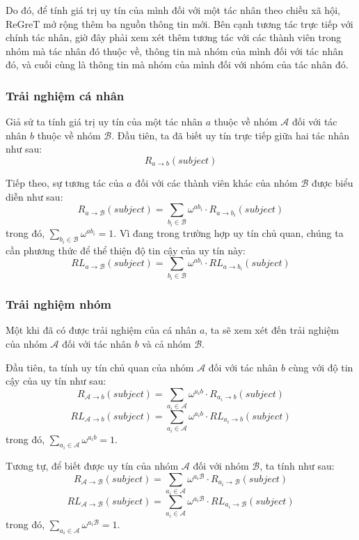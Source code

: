 Do đó, để tính giá trị uy tín của mình đối với một tác nhân theo chiều xã hội, ReGreT mở rộng thêm ba nguồn thông tin mới. Bên cạnh tương tác trực tiếp với chính tác nhân, giờ đây phải xem xét thêm
tương tác với các thành viên trong nhóm mà tác nhân đó thuộc về, thông tin mà nhóm của mình đối với tác nhân đó, và cuối cùng là thông tin mà nhóm của mình đối với nhóm của tác nhân đó.

\subsubsection{Trải nghiệm cá nhân}

Giả sử ta tính giá trị uy tín của một tác nhân $a$ thuộc về nhóm $\mathcal{A}$ đối với tác nhân $b$ thuộc về nhóm $\mathcal{B}$.
Đầu tiên, ta đã biết uy tín trực tiếp giữa hai tác nhân như sau:
\[R_{a \rightarrow b}(subject)\]

Tiếp theo, sự tương tác của $a$ đối với các thành viên khác của nhóm $\mathcal{B}$ được biểu diễn như sau:
\[R_{a \rightarrow \mathcal{B}}(subject)=\sum_{b_i \in \mathcal{B}} \omega^{ab_i} \cdot R_{a \rightarrow b_i}(subject)\]
trong đó, $\displaystyle\sum_{b_i \in \mathcal{B}} \omega^{ab_i} = 1$.
Vì đang trong trường hợp uy tín chủ quan, chúng ta cần phương thức để thể thiện độ tin cậy của uy tín này:
\[RL_{a \rightarrow \mathcal{B}}(subject)=\sum_{b_i \in \mathcal{B}} \omega^{ab_i} \cdot RL_{a \rightarrow b_i}(subject)\]

\subsubsection{Trải nghiệm nhóm}

Một khi đã có được trải nghiệm của cá nhân $a$, ta sẽ xem xét đến trải nghiệm của nhóm $\mathcal{A}$ đối với tác nhân $b$ và cả nhóm $\mathcal{B}$.

Đầu tiên, ta tính uy tín chủ quan của nhóm $\mathcal{A}$ đối với tác nhân $b$ cùng với độ tin cậy của uy tín như sau:
\[R_{\mathcal{A} \rightarrow b}(subject)=\sum_{a_i \in \mathcal{A}} \omega^{a_ib} \cdot R_{a_i \rightarrow b}(subject)\]
\[RL_{\mathcal{A} \rightarrow b}(subject)=\sum_{a_i \in \mathcal{A}} \omega^{a_ib} \cdot RL_{a_i \rightarrow b}(subject)\]
trong đó, $\displaystyle\sum_{a_i \in \mathcal{A}} \omega^{a_ib} = 1$.

Tương tự, để biết được uy tín của nhóm $\mathcal{A}$ đối với nhóm $\mathcal{B}$, ta tính như sau:
\[R_{\mathcal{A} \rightarrow \mathcal{B}}(subject)=\sum_{a_i \in \mathcal{A}} \omega^{a_i\mathcal{B}} \cdot R_{a_i \rightarrow \mathcal{B}}(subject)\]
\[RL_{\mathcal{A} \rightarrow \mathcal{B}}(subject)=\sum_{a_i \in \mathcal{A}} \omega^{a_i\mathcal{B}} \cdot RL_{a_i \rightarrow \mathcal{B}}(subject)\]
trong đó, $\displaystyle\sum_{a_i \in \mathcal{A}} \omega^{a_i\mathcal{B}} = 1$.

